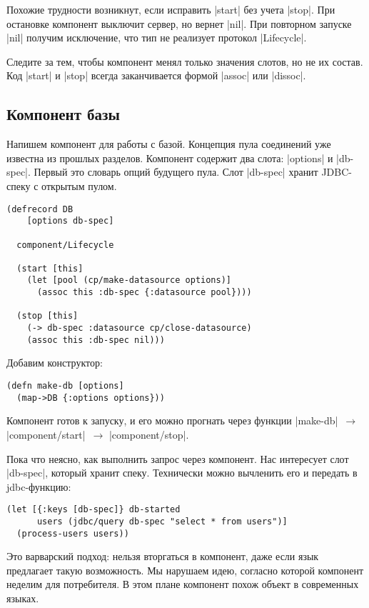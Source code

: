 Похожие трудности возникнут, если исправить \spverb|start| без учета
\spverb|stop|. При остановке компонент выключит сервер, но вернет
\spverb|nil|. При повторном запуске \spverb|nil| получим исключение, что тип не
реализует протокол \spverb|Lifecycle|.

Следите за тем, чтобы компонент менял только значения слотов, но не их
состав. Код \spverb|start| и \spverb|stop| всегда заканчивается формой
\spverb|assoc| или \spverb|dissoc|.

\subsection{Компонент базы}

Напишем компонент для работы с базой. Концепция пула соединений уже известна из
прошлых разделов. Компонент содержит два слота: \spverb|options| и
\spverb|db-spec|. Первый это словарь опций будущего пула. Слот \spverb|db-spec|
хранит JDBC-спеку с открытым пулом.

\begin{verbatim}
(defrecord DB
    [options db-spec]

  component/Lifecycle

  (start [this]
    (let [pool (cp/make-datasource options)]
      (assoc this :db-spec {:datasource pool})))

  (stop [this]
    (-> db-spec :datasource cp/close-datasource)
    (assoc this :db-spec nil)))
\end{verbatim}

Добавим конструктор:

\begin{verbatim}
(defn make-db [options]
  (map->DB {:options options}))
\end{verbatim}

Компонент готов к запуску, и его можно прогнать через функции
\spverb|make-db|~$\to$ \spverb|component/start|~$\to$ \spverb|component/stop|.

Пока что неясно, как выполнить запрос через компонент. Нас интересует слот
\spverb|db-spec|, который хранит спеку. Технически можно вычленить его и
передать в jdbc-функцию:

\begin{verbatim}
(let [{:keys [db-spec]} db-started
      users (jdbc/query db-spec "select * from users")]
  (process-users users))
\end{verbatim}

Это варварский подход: нельзя вторгаться в компонент, даже если язык предлагает
такую возможность. Мы нарушаем идею, согласно которой компонент неделим для
потребителя. В этом плане компонент похож объект в современных языках.

